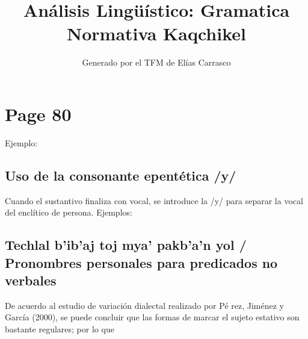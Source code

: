 \documentclass{article}%
\title{Análisis Lingüístico: Gramatica Normativa Kaqchikel}%
\author{Generado por el TFM de Elías Carrasco}%
\begin{document}
%
\normalsize%
\maketitle%
\section{Page 80}%
\label{sec:Page80}%
Ejemplo: %
\subsection{Uso de la consonante epentética /y/}%
\label{subsec:Usodelaconsonanteepenttica/y/}%

%
Cuando el sustantivo finaliza con vocal, se introduce la /y/ para %
separar la vocal del enclítico de persona. %
Ejemplos: %
\subsection{Techlal b’ib’aj toj mya’ pakb’a’n yol / Pronombres personales para predicados no verbales}%
\label{subsec:Techlalbibajtojmyapakbanyol/Pronombrespersonalesparapredicadosnoverbales}%

%
De acuerdo al estudio de variación dialectal realizado por Pé %
rez, Jiménez y García (2000), se puede concluir que las formas %
de marcar el sujeto estativo son bastante regulares; por lo que 

%
\end{document}

